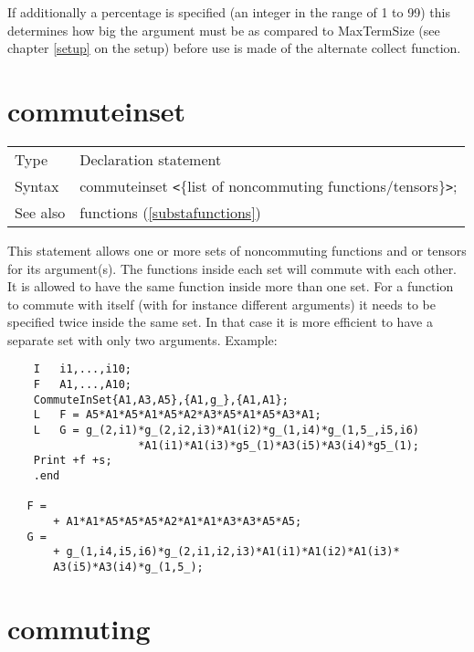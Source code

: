 \noindent If additionally a percentage is specified (an 
integer in the range of 1 to 99) this determines how big the argument must 
be as compared to MaxTermSize (see chapter \ref{setup} on the setup) before 
use is made of the alternate collect function. \vspace{10mm}

 
\section{commuteinset}
\label{substacommuteinset}

\noindent \begin{tabular}{ll}
Type & Declaration statement\\
Syntax & commuteinset {\tt<}$\{$list of noncommuting functions/tensors$\}${\tt>}; \\
See also & functions (\ref{substafunctions})
\end{tabular} \vspace{4mm}

\noindent This statement allows one or more sets of 
noncommuting functions and or tensors for its argument(s). The functions 
inside each set will commute with each other. It is allowed to have the 
same function inside more than one set. For a function to commute with 
itself (with for instance different arguments) it needs to be specified 
twice inside the same set. In that case it is more efficient to have a 
separate set with only two arguments. Example:
\begin{verbatim}
    I   i1,...,i10;
    F   A1,...,A10;
    CommuteInSet{A1,A3,A5},{A1,g_},{A1,A1};
    L   F = A5*A1*A5*A1*A5*A2*A3*A5*A1*A5*A3*A1;
    L   G = g_(2,i1)*g_(2,i2,i3)*A1(i2)*g_(1,i4)*g_(1,5_,i5,i6)
                    *A1(i1)*A1(i3)*g5_(1)*A3(i5)*A3(i4)*g5_(1);
    Print +f +s;
    .end

   F =
       + A1*A1*A5*A5*A5*A2*A1*A1*A3*A3*A5*A5;
   G =
       + g_(1,i4,i5,i6)*g_(2,i1,i2,i3)*A1(i1)*A1(i2)*A1(i3)*
       A3(i5)*A3(i4)*g_(1,5_);
\end{verbatim}
\vspace{10mm}

 
\section{commuting}
\label{substacommuting}

